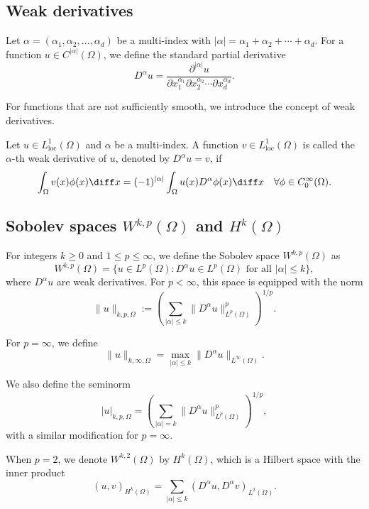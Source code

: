 \subsection{Weak derivatives}

Let $\alpha = (\alpha_1, \alpha_2, \ldots, \alpha_d)$ be a multi-index with $|\alpha| = \alpha_1 + \alpha_2 + \cdots + \alpha_d$. For a function $u \in C^{|\alpha|}(\Omega)$, we define the standard partial derivative
\[
D^\alpha u = \frac{\partial^{|\alpha|} u}{\partial x_1^{\alpha_1} \partial x_2^{\alpha_2} \cdots \partial x_d^{\alpha_d}}.
\]

For functions that are not sufficiently smooth, we introduce the concept of weak derivatives.

\begin{definition}
Let $u \in L^1_{\text{loc}}(\Omega)$ and $\alpha$ be a multi-index. A function $v \in L^1_{\text{loc}}(\Omega)$ is called the $\alpha$-th weak derivative of $u$, denoted by $D^\alpha u = v$, if
\[
  \int_\Omega v(x) \phi(x) \diff x =  (-1)^{|\alpha|} \int_\Omega u(x) D^\alpha \phi(x) \diff x  \quad \forall \phi \in C_0^\infty(\Omega).
\]
\end{definition}

\subsection{Sobolev spaces \texorpdfstring{$W^{k,p}(\Omega)$}{Wk,p(Omega)} and \texorpdfstring{$H^k(\Omega)$}{Hk(Omega)}}

For integers $k \geq 0$ and $1 \leq p \leq \infty$, we define the Sobolev space $W^{k,p}(\Omega)$ as
\[
W^{k,p}(\Omega) = \{u \in L^p(\Omega) : D^\alpha u \in L^p(\Omega) \text{ for all } |\alpha| \leq k\},
\]
where $D^\alpha u$ are weak derivatives. For $p < \infty$, this space is equipped with the norm
\[
\|u\|_{k,p,\Omega} := \left( \sum_{|\alpha| \leq k} \|D^\alpha u\|_{L^p(\Omega)}^p \right)^{1/p}.
\]

For $p = \infty$, we define
\[
\|u\|_{k,\infty,\Omega} = \max_{|\alpha| \leq k} \|D^\alpha u\|_{L^\infty(\Omega)}.
\]

We also define the seminorm
\[
|u|_{k,p,\Omega} = \left( \sum_{|\alpha| = k} \|D^\alpha u\|_{L^p(\Omega)}^p \right)^{1/p},
\]
with a similar modification for $p = \infty$.

When $p = 2$, we denote $W^{k,2}(\Omega)$ by $H^k(\Omega)$, which is a Hilbert space with the inner product
\[
(u, v)_{H^k(\Omega)} = \sum_{|\alpha| \leq k} (D^\alpha u, D^\alpha v)_{L^2(\Omega)}.
\]

